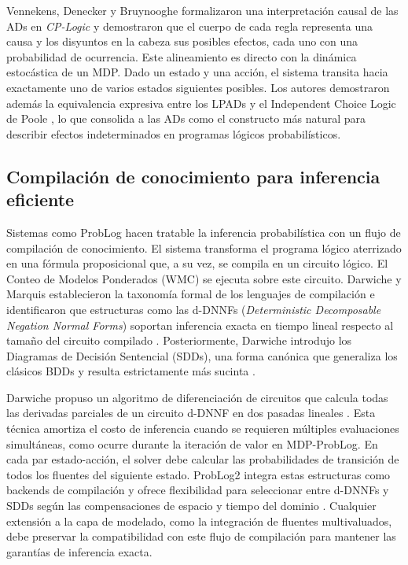 Vennekens, Denecker y Bruynooghe formalizaron una interpretación causal de las ADs en \textit{CP-Logic} \cite{vennekens2009cplogic} y demostraron que el cuerpo de cada regla representa una causa y los disyuntos en la cabeza sus posibles efectos, cada uno con una probabilidad de ocurrencia. Este alineamiento es directo con la dinámica estocástica de un MDP. Dado un estado y una acción, el sistema transita hacia exactamente uno de varios estados siguientes posibles. Los autores demostraron además la equivalencia expresiva entre los LPADs y el Independent Choice Logic de Poole \cite{poole1997independent}, lo que consolida a las ADs como el constructo más natural para describir efectos indeterminados en programas lógicos probabilísticos.

\subsection{Compilación de conocimiento para inferencia eficiente}
\label{sec:ea-compilacion}

Sistemas como ProbLog hacen tratable la inferencia probabilística con un flujo de compilación de conocimiento. El sistema transforma el programa lógico aterrizado en una fórmula proposicional que, a su vez, se compila en un circuito lógico. El Conteo de Modelos Ponderados (WMC) se ejecuta sobre este circuito. Darwiche y Marquis establecieron la taxonomía formal de los lenguajes de compilación e identificaron que estructuras como las d-DNNFs (\textit{Deterministic Decomposable Negation Normal Forms}) soportan inferencia exacta en tiempo lineal respecto al tamaño del circuito compilado \cite{darwiche2002knowledge}. Posteriormente, Darwiche introdujo los Diagramas de Decisión Sentencial (SDDs), una forma canónica que generaliza los clásicos BDDs y resulta estrictamente más sucinta \cite{darwiche2011sdd}.

Darwiche propuso un algoritmo de diferenciación de circuitos que calcula todas las derivadas parciales de un circuito d-DNNF en dos pasadas lineales \cite{darwiche2003differential}. Esta técnica amortiza el costo de inferencia cuando se requieren múltiples evaluaciones simultáneas, como ocurre durante la iteración de valor en MDP-ProbLog. En cada par estado-acción, el solver debe calcular las probabilidades de transición de todos los fluentes del siguiente estado. ProbLog2 integra estas estructuras como backends de compilación y ofrece flexibilidad para seleccionar entre d-DNNFs y SDDs según las compensaciones de espacio y tiempo del dominio \cite{vlasselaer2015problog2}. Cualquier extensión a la capa de modelado, como la integración de fluentes multivaluados, debe preservar la compatibilidad con este flujo de compilación para mantener las garantías de inferencia exacta.

